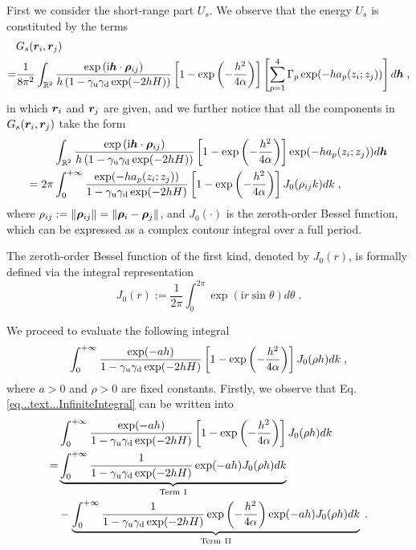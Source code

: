First we consider the short-range part $U_s$.
We observe that the energy $U_s$ is constituted by the terms
\begin{align*}
  &G_s(\boldsymbol{r}_i, \boldsymbol{r}_j)\\
   =& \frac{1}{8\pi^2 }\int_{\mathbb{R}^2} \frac{ \exp{(\mathrm{i} \boldsymbol{h} \cdot \boldsymbol{\rho}_{ij})}}{h \left(1-\gamma_{\mathrm{u}}\gamma_{\mathrm{d}}\exp(-2hH)\right)} \left[1-\exp\left(-\frac{h^2}{4\alpha}\right)\right]\left[\sum_{p=1}^4\Gamma_p\exp(-ha_p(z_i;z_j))\right]d \boldsymbol{h}\;,  
\end{align*}
in which $\bm{r}_i$ and $\bm{r}_j$ are given, and we further notice  that all the components in $G_s(\boldsymbol{r}_i, \boldsymbol{r}_j)$ take the form
\begin{equation}\label{eq::int_Gs}
    \begin{split}
        & \int_{\mathbb{R}^2} \frac{ \exp{(\mathrm{i} \boldsymbol{h} \cdot \boldsymbol{\rho}_{ij})}}{h \left(1-\gamma_{\mathrm{u}}\gamma_{\mathrm{d}}\exp(-2hH)\right)} \left[1-\exp\left(-\frac{h^2}{4\alpha}\right)\right]\exp(-ha_p(z_i;z_j))d \boldsymbol{h}\\
        =2\pi&\int_0^{+\infty} \frac{ \exp(-ha_p(z_i;z_j))}{1-\gamma_{\mathrm{u}}\gamma_{\mathrm{d}}\exp(-2hH)} \left[1-\exp\left(-\frac{h^2}{4\alpha}\right)\right] J_0(\rho_{ij}k)d k\;,
    \end{split}
\end{equation}
where $\rho_{ij}:=\left\lVert\bm{\rho}_{ij}\right\rVert=\left\lVert\bm{\rho}_i-\bm{\rho}_j\right\rVert$, and $ J_0(\cdot)$ is the zeroth-order Bessel function,  which  can   be expressed as a complex contour integral over a full period.
\begin{defination}
    The zeroth-order Bessel function of the first kind, denoted by $ J_0(r)$, is formally defined via the integral representation
\begin{equation}
       J_0(r):=\frac{1}{2\pi} \int_0^{2\pi} \exp(\mathrm{i} r\sin \theta) d \theta\;.  
    \end{equation}
\end{defination}
We proceed to evaluate the following integral
\begin{equation}\label{eq...text...InfiniteIntegral}
\int_0^{+\infty} \frac{ \exp(-ah)}{1-\gamma_{\mathrm{u}}\gamma_{\mathrm{d}}\exp(-2hH)} \left[1-\exp\left(-\frac{h^2}{4\alpha}\right)\right] J_0(\rho h)d k\;,    
\end{equation}
where $a>0$ and $\rho>0$ are fixed constants. Firstly, we observe that Eq. \eqref{eq...text...InfiniteIntegral} can be written into
\begin{align*}
   & \int_0^{+\infty} \frac{ \exp(-ah)}{1-\gamma_{\mathrm{u}}\gamma_{\mathrm{d}}\exp(-2hH)} \left[1-\exp\left(-\frac{h^2}{4\alpha}\right)\right] J_0(\rho h)d k\\
   =&\underbrace{\int_0^{+\infty} \frac{1}{1-\gamma_{\mathrm{u}}\gamma_{\mathrm{d}}\exp(-2hH)}  \exp(-ah)  J_0(\rho h)d k}_{\text{Term}~\mathrm{I}}\\
   &-\underbrace{\int_0^{+\infty} \frac{1}{1-\gamma_{\mathrm{u}}\gamma_{\mathrm{d}}\exp(-2hH)}\exp\left(-\frac{h^2}{4\alpha}\right)  \exp(-ah)  J_0(\rho h)d k}_{\text{Term}~\mathrm{II}}\;.
\end{align*}
